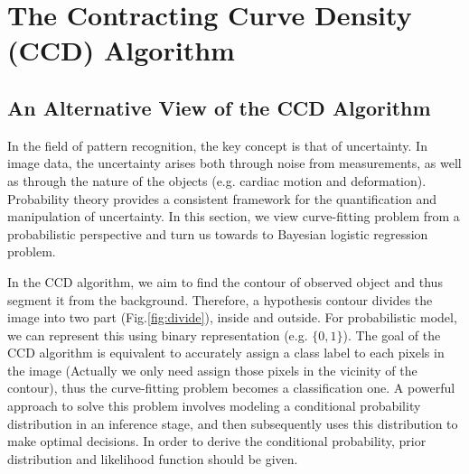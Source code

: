 \section{The Contracting Curve Density (CCD) Algorithm}
\label{sec:sketch}

\subsection{An Alternative View of the CCD Algorithm}
\label{sec:overview}

In the field of pattern recognition, the key concept is that of
uncertainty. In image data, the uncertainty arises both
through noise from measurements, as well as through the nature of
the objects (e.g. cardiac motion and deformation). Probability theory
provides a consistent framework for the quantification and
manipulation of uncertainty.  In this section, we view curve-fitting
problem from a probabilistic perspective and turn us towards to
Bayesian logistic regression problem.

In the CCD algorithm, we aim to find the contour of observed object
and thus segment it from the background. Therefore, a hypothesis
contour divides the image into two part (Fig.\ref{fig:divide}), inside
and outside. For probabilistic model, we can represent this using
binary representation (e.g. $\{0, 1\}$). The goal of the CCD algorithm
is equivalent to accurately
assign a class label to each pixels in the image (Actually we only need assign those pixels in the vicinity of the
contour), thus the curve-fitting problem becomes a classification
one. A powerful approach to solve this problem involves modeling a
conditional probability distribution in an inference stage, and then
subsequently uses this distribution to make optimal decisions. In
order to derive the conditional probability, prior distribution and
likelihood function should be given.

